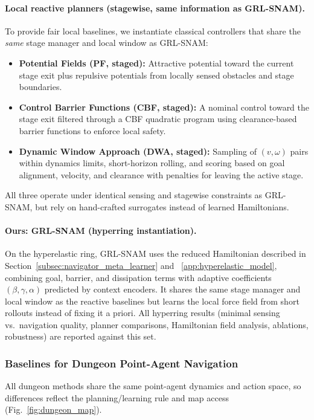 \paragraph{Local reactive planners (stagewise, same information as GRL-SNAM).}
To provide fair local baselines, we instantiate classical controllers that share the \emph{same} stage manager and local window as GRL-SNAM:
\begin{itemize}
    \item \textbf{Potential Fields (PF, staged):} Attractive potential toward the current stage exit plus repulsive potentials from locally sensed obstacles and stage boundaries.
    \item \textbf{Control Barrier Functions (CBF, staged):} A nominal control toward the stage exit filtered through a CBF quadratic program using clearance-based barrier functions to enforce local safety.
    \item \textbf{Dynamic Window Approach (DWA, staged):} Sampling of $(v,\omega)$ pairs within dynamics limits, short-horizon rolling, and scoring based on goal alignment, velocity, and clearance with penalties for leaving the active stage.
\end{itemize}
All three operate under identical sensing and stagewise constraints as GRL-SNAM, but rely on hand-crafted surrogates instead of learned Hamiltonians.

\paragraph{Ours: GRL-SNAM (hyperring instantiation).}
On the hyperelastic ring, GRL-SNAM uses the reduced Hamiltonian described in Section~\ref{subsec:navigator_meta_learner} and ~\ref{app:hyperelastic_model}, combining goal, barrier, and dissipation terms with adaptive coefficients $(\beta,\gamma,\alpha)$ predicted by context encoders. It shares the same stage manager and local window as the reactive baselines but learns the local force field from short rollouts instead of fixing it a priori. All hyperring results (minimal sensing vs.\ navigation quality, planner comparisons, Hamiltonian field analysis, ablations, robustness) are reported against this set.

\subsubsection{Baselines for Dungeon Point-Agent Navigation}
\label{subsubsec:baselines_dungeon}

All dungeon methods share the same point-agent dynamics and action space, so differences reflect the planning/learning rule and map access (Fig.~\ref{fig:dungeon_map}).

